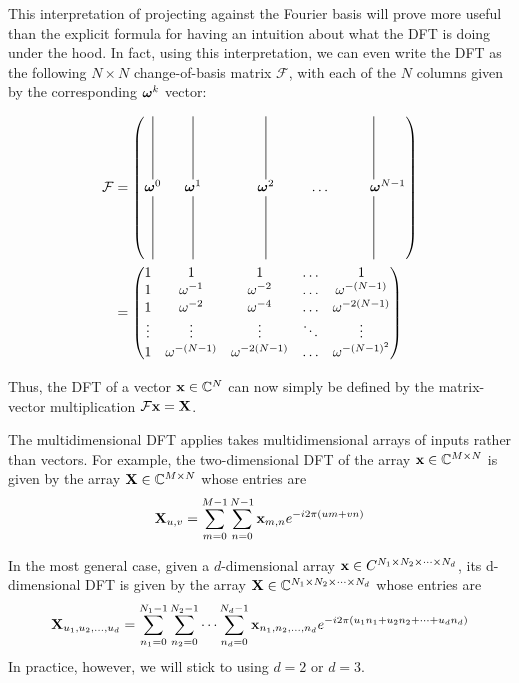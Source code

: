 This interpretation of projecting against the Fourier basis will prove more useful than the explicit formula for having an intuition about what the DFT is doing under the hood.
In fact, using this interpretation, we can even write the DFT as the following $N \times N$ change-of-basis matrix $\mathcal{F}$, with each of the $N$ columns given by the corresponding $\boldsymbol{\omega}^k$ vector:

\begin{align}
	\mathcal{F} &= \begin{pmatrix}
    		\vertbar & \ \  \vertbar & \ \ \ \ \ \ \ \ \  \vertbar & & \vertbar \\
    		\boldomega^0  & \ \   \boldomega^1  & \ \ \ \ \ \ \ \ \  \boldomega^2 & \ \ \ \ \ \dots & \ \ \ \ \ \ \boldomega^{N-1} \\
 		\vertbar & \ \  \vertbar & \ \ \ \ \ \ \ \ \  \vertbar & & \vertbar 
  	\end{pmatrix} \\	
	&= \begin{pmatrix}
	1 & 1 & 1 & \dots & 1 \\
	1 & \omega^{-1} & \omega^{-2} & \dots & \omega^{-(N-1)} \\
	1 & \omega^{-2} & \omega^{-4} & \dots & \omega^{-2(N-1)} \\
	\vdots & \vdots & \vdots & \ddots & \vdots \\
	1 & \omega^{-(N-1)} & \omega^{-2(N-1)} & \dots & \omega^{-{(N-1)}^2}
	\end{pmatrix}	
\end{align}

Thus, the DFT of a vector $\mathbf{x} \in \mathbb{C}^N$ can now simply be defined by the matrix-vector multiplication $\mathcal{F} \mathbf{x} = \mathbf{X}$.

The multidimensional DFT applies takes multidimensional arrays of inputs rather than vectors. For example, the two-dimensional DFT of the array $\mathbf{x} \in \mathbb{C}^{M \times N}$ is given by
the array $\mathbf{X} \in \mathbb{C}^{M \times N}$ whose entries are
\begin{equation}
	\mathbf{X}_{u,v} = \sum_{m=0}^{M-1} \sum_{n=0}^{N-1} \mathbf{x}_{m, n} e^{-i 2 \pi \left(um + vn\right)}
\end{equation}

In the most general case, given a $d$-dimensional array $\mathbf{x} \in C^{N_1 \times N_2 \times \cdots \times N_d}$, its d-dimensional DFT is given by the array $\mathbf{X} \in \mathbb{C}^{N_1 \times N_2 \times \cdots \times N_d}$ whose entries are
\begin{equation}
	\mathbf{X}_{u_1, u_2, \dots, u_d} = \sum_{n_1=0}^{N_1-1} \sum_{n_2=0}^{N_2-1} \cdots \sum_{n_d = 0}^{N_d -1} \mathbf{x}_{n_1, n_2, \dots, n_d} e^{-i 2 \pi \left(u_1 n_1 + u_2 n_2 + \cdots + u_d n_d\right)}
\end{equation}
In practice, however, we will stick to using $d=2$ or $d=3$.
